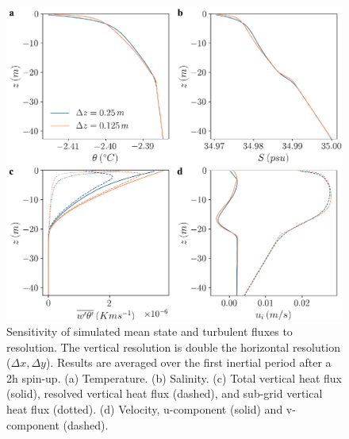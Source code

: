 \documentclass[tc, manuscript]{copernicus}
\begin{document}
\begin{figure}[t]
\includegraphics[width=12cm]{figS8.pdf}
\caption{Sensitivity of simulated mean state and turbulent fluxes to resolution. The vertical resolution is double the horizontal resolution ($\Delta x, \Delta y$). Results are averaged over the first inertial period after a 2\unit{h} spin-up. (a) Temperature. (b) Salinity. (c) Total vertical heat flux (solid), resolved vertical heat flux (dashed), and sub-grid vertical heat flux (dotted). (d) Velocity, u-component (solid) and v-component (dashed).}
\label{fig:res_sensitivity}
\end{figure}
\end{document}
